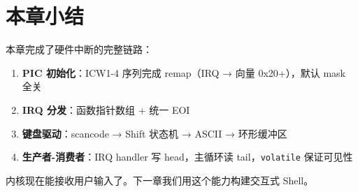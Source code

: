 \section{本章小结}

本章完成了硬件中断的完整链路：

\begin{enumerate}
  \item \textbf{PIC 初始化}：ICW1-4 序列完成 remap（IRQ → 向量 0x20+），默认 mask 全关
  \item \textbf{IRQ 分发}：函数指针数组 + 统一 EOI
  \item \textbf{键盘驱动}：scancode → Shift 状态机 → ASCII → 环形缓冲区
  \item \textbf{生产者-消费者}：IRQ handler 写 head，主循环读 tail，\texttt{volatile} 保证可见性
\end{enumerate}

内核现在能接收用户输入了。下一章我们用这个能力构建交互式 Shell。


